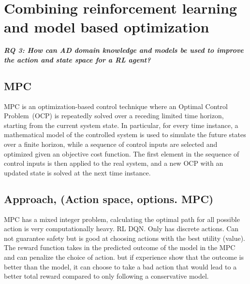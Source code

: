 \newcommand {\matr}[2]{\left[\begin{array}{#1}#2\end{array}\right]}
\newcommand{\E}{\mathbb{E}}
\newcommand{\tr}{\mathrm{tr}}
\newcommand{\x}{{\mathbf{x}}}
\renewcommand{\u}{{\mathbf{u}}}
\newcommand{\w}{{\mathbf{w}}}
\renewcommand{\r}{{\mathbf{r}}}


\chapter{Combining reinforcement learning and model based optimization}\label{ch:mpc}
\begin{center}
\textit{\textbf{RQ 3: How can AD domain knowledge and models be used to improve the action and state space for a RL agent?}}
\end{center}
\vspace{12pt}


\section{MPC}
MPC is an optimization-based control technique where an Optimal Control Problem~(OCP) is repeatedly solved over a receding limited time horizon, starting from the current system state. In particular, for every time instance, a mathematical model of the controlled system is used to simulate the future states over a finite horizon, while a sequence of control inputs are selected and optimized given an objective cost function. The first element in the sequence of control inputs is then applied to the real system, and a new OCP with an updated state is solved at the next time instance.

\section{Approach, (Action space, options. MPC)}
MPC has a mixed integer problem, calculating the optimal path for all possible action is very computationally heavy. 
RL DQN. Only has discrete actions. Can not guarantee safety but is good at choosing actions with the best utility (value). 
The reward function takes in the predicted outcome of the model in the MPC and can penalize the choice of action. but if experience show that the outcome is better than the model, it can choose to take a bad action that would lead to a better total reward compared to only following a conservative model. 

